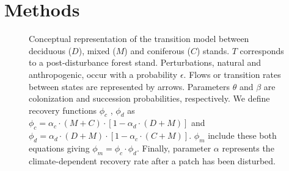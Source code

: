 \section{Methods}   

\begin{figure}
	
	\caption{Conceptual representation of the transition model between deciduous ($D$),
	mixed ($M$) and coniferous ($C$) stands. $T$ corresponds to a post-disturbance forest stand. Perturbations, natural and anthropogenic, occur with a probability $\epsilon$. 
	Flows or transition rates between states are represented by arrows.
	Parameters $\theta$ and $\beta$ are  colonization and succession probabilities,
	respectively. We define recovery functions $\phi_c$ , $\phi_d$ as $\phi_c
	= \alpha_c \cdot (M+C) \cdot [1- \alpha_d \cdot (D+M)]$ and $\phi_d =
	\alpha_d \cdot (D+M) \cdot [1- \alpha_c \cdot (C+M)]$. $\phi_m$ include these both equations giving $\phi_m = \phi_c \cdot \phi_d$. Finally, parameter $\alpha$ represents the climate-dependent recovery rate after a patch has been disturbed.}
	\label{Model}
	\vspace{-1em}
\end{figure}


